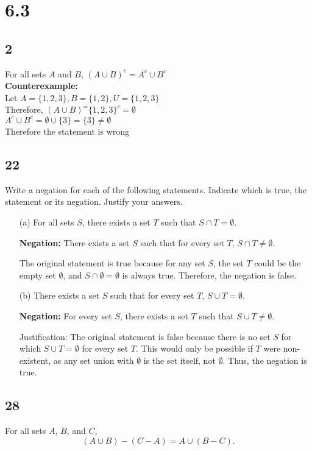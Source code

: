 \documentclass{article}
\begin{document}
\section{6.3}
\subsection{2}
For all sets $A$ and $B$, $(A \cup B)^c = A^c \cup B^c$\\
\textbf{Counterexample:}\\ 
Let $A = \{1,2,3\}, B = \{1,2\}, U = \{1,2,3\}$\\
Therefore, $(A \cup B)^ = \{1,2,3\}^c = \emptyset$\\
$A^c \cup B^c = \emptyset \cup \{3\} = \{3\} \neq \emptyset$\\
Therefore the statement is wrong

\subsection{22}
Write a negation for each of the following statements. Indicate which is true, the statement or its negation. Justify your answers.

\begin{enumerate}
    \item[(a)] For all sets $S$, there exists a set $T$ such that $S \cap T = \emptyset$.

    \textbf{Negation:} There exists a set $S$ such that for every set $T$, $S \cap T \neq \emptyset$.
    
     The original statement is true because for any set $S$, the set $T$ could be the empty set $\emptyset$, and $S \cap \emptyset = \emptyset$ is always true. Therefore, the negation is false.

    \item[(b)] There exists a set $S$ such that for every set $T$, $S \cup T = \emptyset$.

    \textbf{Negation:} For every set $S$, there exists a set $T$ such that $S \cup T \neq \emptyset$.

    Justification: The original statement is false because there is no set $S$ for which $S \cup T = \emptyset$ for every set $T$. This would only be possible if $T$ were non-existent, as any set union with $\emptyset$ is the set itself, not $\emptyset$. Thus, the negation is true.
\end{enumerate}
\subsection{28}
For all sets $A$, $B$, and $C$,
\[ (A \cup B) - (C - A) = A \cup (B - C). \]
\end{document}
